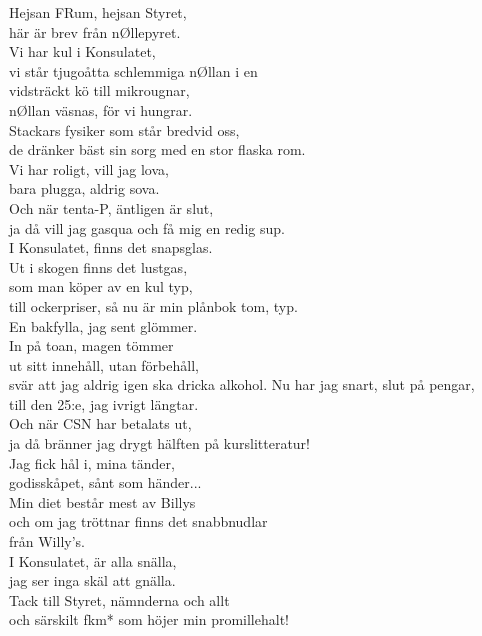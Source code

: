 \documentclass[a6paper,10pt]{article}
\begin{document}
\begin{center}
\end{center}
\begin{lyrics}
Hejsan FRum, hejsan Styret,\\
här är brev från nØllepyret.\\
Vi har kul i Konsulatet,\\
vi står tjugoåtta schlemmiga nØllan i en
\vspace{5pt}\\
vidsträckt kö till mikrougnar,\\
nØllan väsnas, för vi hungrar.\\
Stackars fysiker som står bredvid oss,\\
de dränker bäst sin sorg med en stor flaska rom.
\vspace{5pt}\\
Vi har roligt, vill jag lova,\\
bara plugga, aldrig sova.\\
Och när tenta-P, äntligen är slut,\\
ja då vill jag gasqua och få mig en redig sup.
\vspace{5pt}\\
I Konsulatet, finns det snapsglas.\\
Ut i skogen finns det lustgas,\\
som man köper av en kul typ,\\
till ockerpriser, så nu är min plånbok tom, typ.
\vspace{5pt}\\
En bakfylla, jag sent glömmer.\\
In på toan, magen tömmer\\
ut sitt innehåll, utan förbehåll,\\
svär att jag aldrig igen ska dricka alkohol.
\setlength{\oddsidemargin}{-0.47in}
\noindent
Nu har jag snart, slut på pengar,\\
till den 25:e, jag ivrigt längtar.\\
Och när CSN har betalats ut,\\
ja då bränner jag drygt hälften på kurslitteratur!
\vspace{5pt}\\
Jag fick hål i, mina tänder,\\
godisskåpet, sånt som händer...\\
Min diet består mest av Billys\\
och om jag tröttnar finns det snabbnudlar \\ från Willy’s.
\vspace{5pt}\\
I Konsulatet, är alla snälla,\\
jag ser inga skäl att gnälla.\\
Tack till Styret, nämnderna och allt\\
och särskilt fkm* som höjer min promillehalt!
\end{lyrics}
\end{document}

